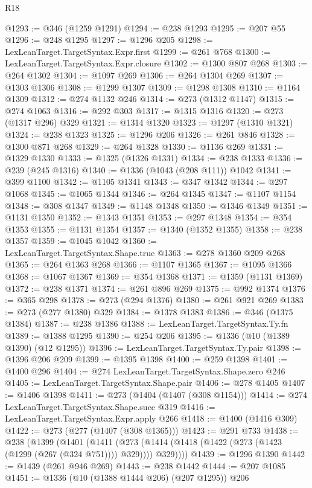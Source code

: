 \begin{lexlean}{R18}
\begin{coremodule}
{{{{{{{{{{{{{{{{{{{@1293 := @346 (@1259 @1291)
@1294 := @238 @1293
@1295 := @207 @55
@1296 := @248 @1295
@1297 := @1296 @205
@1298 := LexLeanTarget.TargetSyntax.Expr.first
@1299 := @261 @768
@1300 := LexLeanTarget.TargetSyntax.Expr.closure
@1302 := @1300 @807 @268
@1303 := @264 @1302
@1304 := @1097 @269
@1306 := @264 @1304 @269
@1307 := @1303 @1306
@1308 := @1299 @1307
@1309 := @1298 @1308
@1310 := @1164 @1309
@1312 := @274 @1132 @246
@1314 := @273 (@1312 @1147)
@1315 := @274 @1063
@1316 := @292 @303
@1317 := @1315 @1316
@1320 := @273 (@1317 @296) @329
@1321 := @1314 @1320
@1323 := @1297 (@1310 @1321)
@1324 := @238 @1323
@1325 := @1296 @206
@1326 := @261 @846
@1328 := @1300 @871 @268
@1329 := @264 @1328
@1330 := @1136 @269
@1331 := @1329 @1330
@1333 := @1325 (@1326 @1331)
@1334 := @238 @1333
@1336 := @239 (@245 @1316)
@1340 := @1336 (@1043 (@208 @111)) @1042
@1341 := @399 @1100
@1342 := @1105 @1341
@1343 := @347 @1342
@1344 := @297 @1068
@1345 := @1065 @1344
@1346 := @264 @1345
@1347 := @1107 @1154
@1348 := @308 @1347
@1349 := @1148 @1348
@1350 := @1346 @1349
@1351 := @1131 @1350
@1352 := @1343 @1351
@1353 := @297 @1348
@1354 := @354 @1353
@1355 := @1131 @1354
@1357 := @1340 (@1352 @1355)
@1358 := @238 @1357
@1359 := @1045 @1042
@1360 := LexLeanTarget.TargetSyntax.Shape.true
@1363 := @278 @1360 @209 @268
@1365 := @264 @1363 @268
@1366 := @1107 @1365
@1367 := @1095 @1366
@1368 := @1067 @1367
@1369 := @354 @1368
@1371 := @1359 (@1131 @1369)
@1372 := @238 @1371
@1374 := @261 @896 @269
@1375 := @992 @1374
@1376 := @365 @298
@1378 := @273 (@294 @1376)
@1380 := @261 @921 @269
@1383 := @273 (@277 @1380) @329
@1384 := @1378 @1383
@1386 := @346 (@1375 @1384)
@1387 := @238 @1386
@1388 := LexLeanTarget.TargetSyntax.Ty.fn
@1389 := @1388 @1295
@1390 := @254 @206
@1395 := @1336 (@10 (@1389 @1390) (@12 @1295))
@1396 := LexLeanTarget.TargetSyntax.Ty.pair
@1398 := @1396 @206 @209
@1399 := @1395 @1398
@1400 := @259 @1398
@1401 := @1400 @296
@1404 := @274 LexLeanTarget.TargetSyntax.Shape.zero @246
@1405 := LexLeanTarget.TargetSyntax.Shape.pair
@1406 := @278 @1405
@1407 := @1406 @1398
@1411 := @273 (@1404 (@1407 (@308 @1154)))
@1414 := @274 LexLeanTarget.TargetSyntax.Shape.succ @319
@1416 := LexLeanTarget.TargetSyntax.Expr.apply @266
@1418 := @1400 (@1416 @309)
@1422 := @273 (@277 (@1407 (@308 @1365)))
@1423 := @291 @733
@1438 := @238
    (@1399
      (@1401
        (@1411 (@273 (@1414 (@1418 (@1422 (@273 (@1423 (@1299 (@267 (@324 @751)))) @329)))) @329))))
@1439 := @1296 @1390
@1442 := @1439 (@261 @946 @269)
@1443 := @238 @1442
@1444 := @207 @1085
@1451 := @1336 (@10 (@1388 @1444 @206) (@207 @1295)) @206
}}}}}}}}}}}}}}}}}}}
\end{coremodule}
\end{lexlean}
